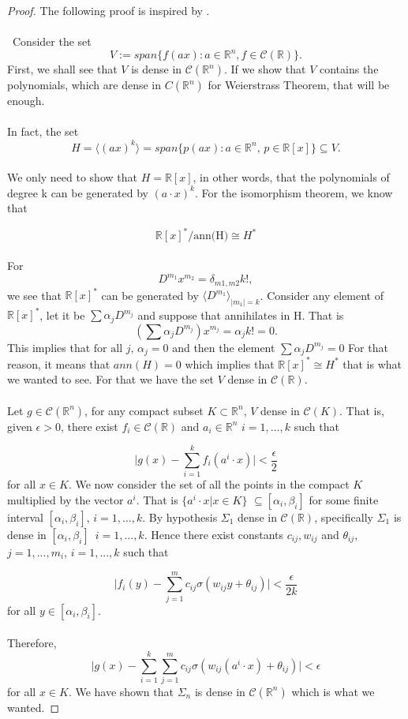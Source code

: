 \documentclass[../main.tex]{subfiles}
\begin{document}
	\begin{proof} %
			The following proof is inspired by \cite{chui_approximation}.\\ \\ Consider the set $$V:= span\{ f(ax) : a \in \mathbb{R}^n, f \in \mathcal{C}(\mathbb{R}) \}.$$ First, we shall see that $V$ is dense in $\mathcal{C}(\mathbb{R}^n)$.  If we show that $V$ contains the polynomials, which are dense in $C(\mathbb{R}^n)$ for Weierstrass Theorem, that will be enough. \\ \\
			\noindent In fact, the set $$ H = \langle (a x)^k\rangle = span\{ p(ax) : a \in \mathbb{R}^n, \, p \in \mathbb{R}[x] \} \subseteq V.$$ \\
			We only need to show that $H=\mathbb{R}[x]$, in other words, that the polynomials of degree k can be generated by $(a\cdot x)^k$. For the isomorphism theorem, we know that
			
			 $$\mathbb{R}[x]^*/\text{ann(H)}\cong H^*$$
			 \\ 
			 For $$D^{m_1} x^{m_2}= \delta_{m1,m2}k!, $$ we see that $\mathbb{R}[x]^*$ can be generated by $\langle D^{m_1}\rangle _{|m_1|=k}$. Consider any element of $\mathbb{R}[x]^*$, let it be $\sum \alpha_j D^{m_j}$ and suppose that annihilates in H. That is $$(\sum \alpha_j D^{m_j} ) x^{m_j}=\alpha_j k! = 0.$$ \noindent This implies that $\text{for all } j,\, \alpha_j =0$ and then the element $\sum \alpha_j D^{m_j}=0$
			 For that reason, it means that $ann(H)=0$ which implies that $\mathbb{R}[x]^*\cong H^*$ that is what we wanted to see. For that we have the set $V$ dense in $\mathcal{C}(\mathbb{R})$.
			\\ \\ 
			\noindent Let $g\in \mathcal{C}(\mathbb{R}^n) $, for any compact subset $K \subset \mathbb{R}^n  $, $V$ dense in $\mathcal{C}(K)$. That is, given $\epsilon >0$, there exist $f_i\in  \mathcal{C}(\mathbb{R})$ and $a_i \in \mathbb{R}^n $    {\scriptsize $i=1,...,k$}  such that
			
			$$ \big| g(x)-\sum_{i=1}^k f_i(a^i \cdot x) \big| < \frac{\epsilon}{2}$$
			for all $x\in K$. We now consider the set of all the points in the compact $K$ multiplied by the vector $a^i$. That is $\{a^i \cdot x | x \in K\}$ $\subseteq[\alpha_i,\beta_i] $ for some finite interval $[\alpha_i,\beta_i]$, $i=1,...,k$. By hypothesis $\Sigma_1 $ dense in $\mathcal{C}(\mathbb{R})$, specifically $\Sigma_1 $ is dense in $[\alpha_i,\beta_i ]$ $ \, i=1,...,k$. Hence there exist constants $c_{ij}, w_{ij}$ and $\theta_{ij}$, $j=1,...,m_i$, $i=1,...,k$ such that 
			
			$$ \big|f_i(y) - \sum_{j=1}^{m} c_{ij} \sigma(w_{ij}y+ \theta_{ij})\big| < \frac{\epsilon}{2k}$$
			for all $y\in [\alpha_i,\beta_i ]$. \\ \\
			Therefore, 
			$$ \big| g(x) - \sum_{i=1}^k \sum_{j=1}^m c_{ij} \sigma(w_{ij}(a^i \cdot x) + \theta_{ij})  \big| < \epsilon$$
			for all $x\in K$. We have shown that  $\Sigma_n$ is dense in $\mathcal{C}(\mathbb{R}^n)$ which is what we wanted.
		\end{proof}
\end{document}
